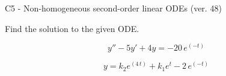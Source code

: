 \begin{exercise}
  \begin{exerciseTitle}C5 - Non-homogeneous second-order linear ODEs (ver. 48)\end{exerciseTitle}
  \begin{exerciseStatement}
    
Find the solution to the given ODE.

    
\[y''-5y'+4y = -20 \, e^{\left(-t\right)}\]

  \end{exerciseStatement}
  \begin{exerciseAnswer}
    
\[y= k_{2} e^{\left(4 \, t\right)} + k_{1} e^{t} - 2 \, e^{\left(-t\right)}\]

  \end{exerciseAnswer}
\end{exercise}